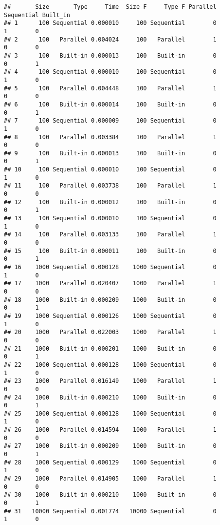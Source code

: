 \documentclass[
]{article}
\begin{document}
\begin{verbatim}
##       Size       Type     Time  Size_F     Type_F Parallel Sequential Built_In
## 1      100 Sequential 0.000010     100 Sequential        0          1        0
## 2      100   Parallel 0.004024     100   Parallel        1          0        0
## 3      100   Built-in 0.000013     100   Built-in        0          0        1
## 4      100 Sequential 0.000010     100 Sequential        0          1        0
## 5      100   Parallel 0.004448     100   Parallel        1          0        0
## 6      100   Built-in 0.000014     100   Built-in        0          0        1
## 7      100 Sequential 0.000009     100 Sequential        0          1        0
## 8      100   Parallel 0.003384     100   Parallel        1          0        0
## 9      100   Built-in 0.000013     100   Built-in        0          0        1
## 10     100 Sequential 0.000010     100 Sequential        0          1        0
## 11     100   Parallel 0.003738     100   Parallel        1          0        0
## 12     100   Built-in 0.000012     100   Built-in        0          0        1
## 13     100 Sequential 0.000010     100 Sequential        0          1        0
## 14     100   Parallel 0.003133     100   Parallel        1          0        0
## 15     100   Built-in 0.000011     100   Built-in        0          0        1
## 16    1000 Sequential 0.000128    1000 Sequential        0          1        0
## 17    1000   Parallel 0.020407    1000   Parallel        1          0        0
## 18    1000   Built-in 0.000209    1000   Built-in        0          0        1
## 19    1000 Sequential 0.000126    1000 Sequential        0          1        0
## 20    1000   Parallel 0.022003    1000   Parallel        1          0        0
## 21    1000   Built-in 0.000201    1000   Built-in        0          0        1
## 22    1000 Sequential 0.000128    1000 Sequential        0          1        0
## 23    1000   Parallel 0.016149    1000   Parallel        1          0        0
## 24    1000   Built-in 0.000210    1000   Built-in        0          0        1
## 25    1000 Sequential 0.000128    1000 Sequential        0          1        0
## 26    1000   Parallel 0.014594    1000   Parallel        1          0        0
## 27    1000   Built-in 0.000209    1000   Built-in        0          0        1
## 28    1000 Sequential 0.000129    1000 Sequential        0          1        0
## 29    1000   Parallel 0.014905    1000   Parallel        1          0        0
## 30    1000   Built-in 0.000210    1000   Built-in        0          0        1
## 31   10000 Sequential 0.001774   10000 Sequential        0          1        0

\end{verbatim}
\end{document}
